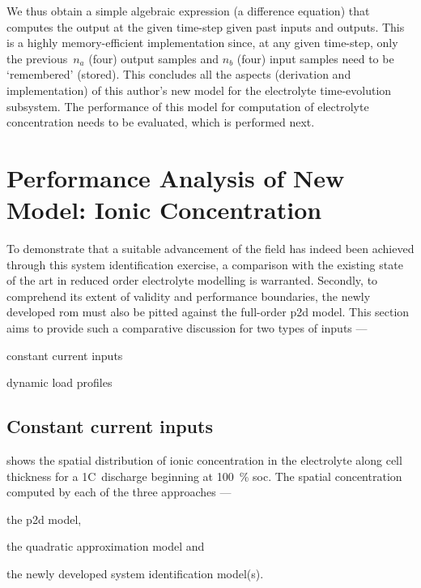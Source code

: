We  thus obtain  a  simple  algebraic expression  (a  difference equation)  that
computes the output  at the given time-step given past  inputs and outputs. This
is a highly memory-efficient implementation  since, at any given time-step, only
the previous~$n_a$ (four) output samples  and $n_b$ (four) input samples need to
be  `remembered'  (stored).  This  concludes all  the  aspects  (derivation  and
implementation) of  this author's new  model for the  electrolyte time-evolution
subsystem.  The  performance  of  this  model  for  computation  of  electrolyte
concentration needs to be evaluated, which is performed next.

\section{Performance Analysis of New Model: Ionic Concentration}\label{sec:perfanalysisnewmodel}

To demonstrate that a suitable advancement of the field has indeed been achieved
through  this system  identification exercise,  a comparison  with the  existing
state of the art in reduced  order electrolyte modelling is warranted. Secondly,
to  comprehend its  extent of  validity  and performance  boundaries, the  newly
developed \gls{rom} must also be  pitted against the full-order \gls{p2d} model.
This section  aims to  provide such  a comparative discussion  for two  types of
inputs ---
\begin{enumerate*}[label=\itshape\alph*\upshape)]
    \item constant current inputs
    \item dynamic load profiles
\end{enumerate*}

\subsection{Constant current inputs}\label{subsec:tfquadceconstcurrinput}

 shows  the spatial distribution  of ionic
concentration  in  the electrolyte  along  cell  thickness  for a  1C~discharge
beginning at \SI{100}{\percent} \gls{soc}. The spatial concentration computed by
each of the three approaches ---
\begin{enumerate*}[label=\roman*)]
    \item the \gls{p2d} model,
    \item the quadratic approximation model and
    \item the newly developed system identification model(s).
\end{enumerate*}

